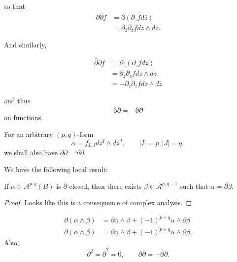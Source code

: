 \documentclass{book}
\begin{document}
\noindent
so that
$$
\begin{aligned}
\partial \bar\partial f
&=\partial(\partial_{\bar{z}}f d\bar{z})\\
&=\partial_z \partial_{\bar{z}}f dz \wedge
d\bar{z}.
\end{aligned}
$$

\noindent
And similarly,

$$
\begin{aligned}
\bar\partial \partial f
&=\partial_{\bar{z}}(\partial_z f dz)\\
&=\partial_{\bar{z}}\partial_zf d\bar{z}
\wedge dz\\
&=-\partial_z\partial_{\bar{z}}fdz\wedge
d\bar{z}
\end{aligned}
$$

\noindent
and thus
$$
\partial\bar\partial=-\bar\partial \partial
$$
on functions.

For an arbitrary $(p,q)$-form
$$
\alpha=f_{I,J}dz^I \wedge d\bar{z}^J,\qquad
|I|=p,|J|=q,
$$
we shall also have
$\partial\bar\partial=\bar\partial\partial$.



\medskip\noindent
We have the following local result:
\begin{lemma}
\label{lemma-poincare-dbar-local-lemma}
\begin{reference}
\cite[Corollary 1.3.9]{huc}
\end{reference}
If $\alpha \in \mathcal{A}^{p,q}(B)$
is $\bar\partial$ closed, then there exists
$\beta \in \mathcal{A}^{p,q-1}$ such that
$\alpha=\bar\partial \beta$.
\end{lemma}

\begin{proof}
Looks like this is a consequence of complex
analysis.
\end{proof}

\begin{proposition}
\label{proposition-leibniz-for-del}
$$
\begin{aligned}
\partial(\alpha\wedge\beta)&=
\partial\alpha\wedge\beta
+(-1)^{p+q}\alpha\wedge\partial\beta\\
\bar\partial(\alpha\wedge\beta)
&=\partial\alpha\wedge\beta+(-1)^{p+q}
\alpha\wedge\bar\partial\beta.
\end{aligned}
$$
Also,
$$
\partial^2=\bar\partial^2=0,\qquad \partial
\bar\partial=-\bar\partial \partial.
$$

\end{proposition}
\end{document}
